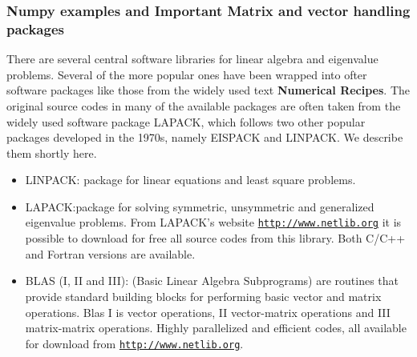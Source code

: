 \documentclass{beamer}
\begin{document}
\begin{frame}
\frametitle{Numpy examples and Important Matrix and vector handling packages}

There are several central software libraries for linear algebra and eigenvalue problems. Several of the more
popular ones have been wrapped into ofter software packages like those from the widely used text \textbf{Numerical Recipes}. The original source codes in many of the available packages are often taken from the widely used
software package LAPACK, which follows two other popular packages
developed in the 1970s, namely EISPACK and LINPACK.  We describe them shortly here.

\begin{itemize}
  \item LINPACK: package for linear equations and least square problems.

  \item LAPACK:package for solving symmetric, unsymmetric and generalized eigenvalue problems. From LAPACK's website \href{{http://www.netlib.org}}{\nolinkurl{http://www.netlib.org}} it is possible to download for free all source codes from this library. Both C/C++ and Fortran versions are available.

  \item BLAS (I, II and III): (Basic Linear Algebra Subprograms) are routines that provide standard building blocks for performing basic vector and matrix operations. Blas I is vector operations, II vector-matrix operations and III matrix-matrix operations. Highly parallelized and efficient codes, all available for download from \href{{http://www.netlib.org}}{\nolinkurl{http://www.netlib.org}}.
\end{itemize}

\noindent
\end{frame}
\end{document}
